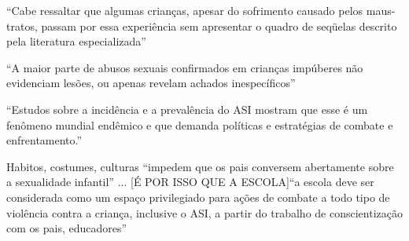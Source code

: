 ``Cabe ressaltar que algumas crianças, apesar do sofrimento causado pelos maus-tratos, passam por essa experiência sem apresentar o quadro de seqüelas descrito pela literatura especializada'' \cite{aded2006abuso} 

``A maior parte de abusos sexuais confirmados em crianças impúberes não evidenciam lesões, ou apenas revelam achados inespecíficos''\cite{aded2006abuso} 

``Estudos  sobre  a  incidência  e  a  prevalência  do  ASI  mostram  que  esse  é  um fenômeno  mundial  endêmico  e  que  demanda  políticas  e  estratégias  de  combate  e enfrentamento.'' \cite{pinto2017avaliaccao}

Habitos, costumes, culturas ``impedem que os pais conversem abertamente sobre a sexualidade infantil'' ...  [É POR ISSO QUE A ESCOLA]``a  escola  deve  ser  considerada  como  um  espaço  privilegiado  para ações  de  combate  a  todo  tipo  de  violência  contra  a  criança,  inclusive  o  ASI,  a  partir  do trabalho  de  conscientização  com  os  pais,  educadores'' \cite{pinto2017avaliaccao}





\cite{epidemiological2014Singh}













